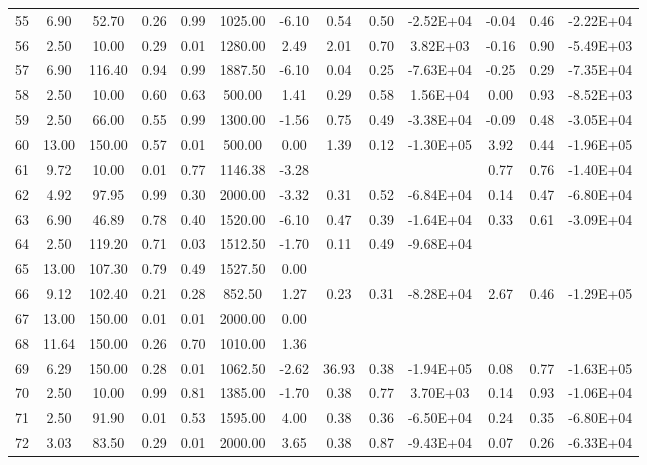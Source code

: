 \begin{landscape}
\begin{center}
\begin{longtable}{|c|c|c|c|c|c|c|c|c|c|c|c|c|}
55  & 6.90  & 52.70  & 0.26 & 0.99 & 1025.00 & -6.10 & 0.54  & 0.50 & -2.52E+04 & -0.04 & 0.46 & -2.22E+04 \\
56  & 2.50  & 10.00  & 0.29 & 0.01 & 1280.00 & 2.49  & 2.01  & 0.70 & 3.82E+03  & -0.16 & 0.90 & -5.49E+03 \\
57  & 6.90  & 116.40 & 0.94 & 0.99 & 1887.50 & -6.10 & 0.04  & 0.25 & -7.63E+04 & -0.25 & 0.29 & -7.35E+04 \\
58  & 2.50  & 10.00  & 0.60 & 0.63 & 500.00  & 1.41  & 0.29  & 0.58 & 1.56E+04  & 0.00  & 0.93 & -8.52E+03 \\
59  & 2.50  & 66.00  & 0.55 & 0.99 & 1300.00 & -1.56 & 0.75  & 0.49 & -3.38E+04 & -0.09 & 0.48 & -3.05E+04 \\
60  & 13.00 & 150.00 & 0.57 & 0.01 & 500.00  & 0.00  & 1.39  & 0.12 & -1.30E+05 & 3.92  & 0.44 & -1.96E+05 \\
61  & 9.72  & 10.00  & 0.01 & 0.77 & 1146.38 & -3.28 &       &      &           & 0.77  & 0.76 & -1.40E+04 \\
62  & 4.92  & 97.95  & 0.99 & 0.30 & 2000.00 & -3.32 & 0.31  & 0.52 & -6.84E+04 & 0.14  & 0.47 & -6.80E+04 \\
63  & 6.90  & 46.89  & 0.78 & 0.40 & 1520.00 & -6.10 & 0.47  & 0.39 & -1.64E+04 & 0.33  & 0.61 & -3.09E+04 \\
64  & 2.50  & 119.20 & 0.71 & 0.03 & 1512.50 & -1.70 & 0.11  & 0.49 & -9.68E+04 &       &      &           \\
65  & 13.00 & 107.30 & 0.79 & 0.49 & 1527.50 & 0.00  &       &      &           &       &      &           \\
66  & 9.12  & 102.40 & 0.21 & 0.28 & 852.50  & 1.27  & 0.23  & 0.31 & -8.28E+04 & 2.67  & 0.46 & -1.29E+05 \\
67  & 13.00 & 150.00 & 0.01 & 0.01 & 2000.00 & 0.00  &       &      &           &       &      &           \\
68  & 11.64 & 150.00 & 0.26 & 0.70 & 1010.00 & 1.36  &       &      &           &       &      &           \\
69  & 6.29  & 150.00 & 0.28 & 0.01 & 1062.50 & -2.62 & 36.93 & 0.38 & -1.94E+05 & 0.08  & 0.77 & -1.63E+05 \\
70  & 2.50  & 10.00  & 0.99 & 0.81 & 1385.00 & -1.70 & 0.38  & 0.77 & 3.70E+03  & 0.14  & 0.93 & -1.06E+04 \\
71  & 2.50  & 91.90  & 0.01 & 0.53 & 1595.00 & 4.00  & 0.38  & 0.36 & -6.50E+04 & 0.24  & 0.35 & -6.80E+04 \\
72  & 3.03  & 83.50  & 0.29 & 0.01 & 2000.00 & 3.65  & 0.38  & 0.87 & -9.43E+04 & 0.07  & 0.26 & -6.33E+04 \\

\end{longtable}
\end{center}
\end{landscape}
